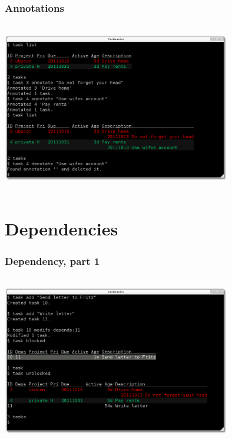 \documentclass[t,handout]{beamer}
\begin{document}
\begin{frame}
\frametitle{Annotations}
\begin{center}
\includegraphics[width=10cm,height=7.5cm]{annotations.png}
\end{center}
\end{frame}

\section{Dependencies}

\begin{frame}
\frametitle{Dependency, part 1}
\begin{center}
\includegraphics[width=10cm,height=7.5cm]{dependency01.png}
\end{center}
\end{frame}
\end{document}
